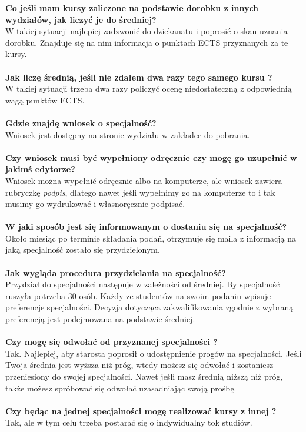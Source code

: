\documentclass[11pt]{article}
\begin{document}
\textbf{Co jeśli mam kursy zaliczone na podstawie dorobku z innych wydziałów, jak liczyć je do średniej?} \\
\indent W takiej sytuacji najlepiej zadzwonić do dziekanatu i poprosić o skan uznania dorobku. Znajduje się na nim informacja o punktach ECTS przyznanych za te kursy.  \\\\
\textbf{Jak liczę średnią, jeśli nie zdałem dwa razy tego samego kursu ?} \\
\indent W takiej sytuacji trzeba dwa razy policzyć ocenę niedostateczną z odpowiednią wagą punktów ECTS.  \\\\
\textbf{Gdzie znajdę wniosek o specjalność?} \\
\indent Wniosek jest dostępny na stronie wydziału w zakładce do pobrania. \\\\
\textbf{Czy wniosek musi być wypełniony odręcznie czy mogę go uzupełnić w jakimś edytorze?} \\
\indent Wniosek można wypełnić odręcznie albo na komputerze, ale wniosek zawiera rubryczkę \textit{podpis}, dlatego nawet jeśli wypełnimy go na komputerze to i tak musimy go wydrukować i własnoręcznie podpisać. \\\\
\textbf{W jaki sposób jest się informowanym o dostaniu się na specjalność?} \\
\indent Około miesiąc po terminie składania podań, otrzymuje się maila z informacją na jaką specjalność zostało się przydzielonym. \\\\
\textbf{Jak wygląda procedura przydzielania na specjalność?} \\
\indent Przydział do specjalności następuje w zależności od średniej. By specjalność ruszyła potrzeba 30 osób. Każdy ze studentów na swoim podaniu wpisuje preferencje specjalności. Decyzja dotycząca zakwalifikowania zgodnie z wybraną preferencją jest podejmowana na podstawie średniej. 
\\\\
\textbf{Czy mogę się odwołać od przyznanej specjalności ?} \\
\indent Tak. Najlepiej, aby starosta poprosił o udostępnienie progów na specjalności. Jeśli Twoja średnia jest wyższa niż próg, wtedy możesz się odwołać i zostaniesz przeniesiony do swojej specjalności. Nawet jeśli masz średnią niższą niż próg, także możesz spróbować się odwołać uzasadniając swoją prośbę.  
\\\\
\textbf{Czy będąc na jednej specjalności mogę realizować kursy z innej ?} \\
\indent Tak, ale w tym celu trzeba postarać się o  indywidualny tok studiów. 
\\\\
\end{document}
